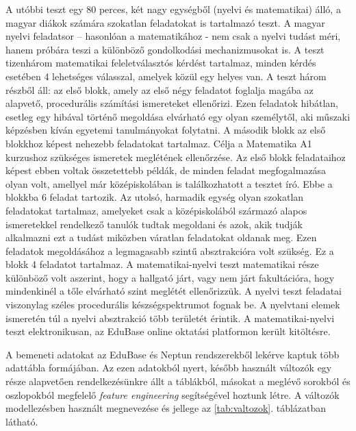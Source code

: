 \documentclass[12pt]{article}
\begin{document}
A utóbbi teszt egy 80 perces, két nagy egységből (nyelvi és matematikai) álló, a magyar diákok számára szokatlan feladatokat is tartalmazó teszt. A magyar nyelvi feladatsor – hasonlóan a matematikához - nem csak a nyelvi tudást méri, hanem próbára teszi a különböző gondolkodási mechanizmusokat is. A teszt tizenhárom matematikai feleletválasztós kérdést tartalmaz, minden kérdés esetében 4 lehetséges válasszal, amelyek közül egy helyes van. A teszt három részből áll: az első blokk, amely az első négy feladatot foglalja magába az alapvető, procedurális számítási ismereteket ellenőrizi. Ezen feladatok hibátlan, esetleg egy hibával történő megoldása elvárható egy olyan személytől, aki műszaki képzésben kíván egyetemi tanulmányokat folytatni. A második blokk az első blokkhoz képest nehezebb feladatokat tartalmaz. Célja a Matematika A1 kurzushoz szükséges ismeretek meglétének ellenőrzése. Az első blokk feladataihoz képest ebben voltak összetettebb példák, de minden feladat megfogalmazása olyan volt, amellyel már középiskolában is találkozhatott a tesztet író. Ebbe a blokkba 6 feladat tartozik. Az utolsó, harmadik egység olyan szokatlan feladatokat tartalmaz, amelyeket csak a középiskolából származó alapos ismeretekkel rendelkező tanulók tudtak megoldani és azok, akik tudják alkalmazni ezt a tudást miközben váratlan feladatokat oldanak meg. Ezen feladatok megoldásához a legmagasabb szintű absztrakcióra volt szükség. Ez a blokk 4 feladatot tartalmaz. A matematikai-nyelvi teszt matematikai része különböző volt aszerint, hogy a hallgató járt, vagy nem járt fakultációra, hogy mindenkinél a tőle elvárható szint meglétét ellenőrizzük. A nyelvi teszt feladatai viszonylag széles procedurális készségspektrumot fognak be. A nyelvtani elemek ismeretén túl a nyelvi absztrakció több területét érintik. A matematikai-nyelvi teszt elektronikusan, az EduBase online oktatási platformon került kitöltésre.

A bemeneti adatokat az EduBase és Neptun rendszerekből lekérve kaptuk több adattábla formájában. Az ezen adatokból nyert, később használt változók egy része alapvetően rendelkezésünkre állt a táblákból, másokat a meglévő sorokból és oszlopokból megfelelő \textit{feature engineering} segítségével hoztunk létre. A változók modellezésben használt megnevezése és jellege az \ref{tab:valtozok}. táblázatban látható.
\end{document}
